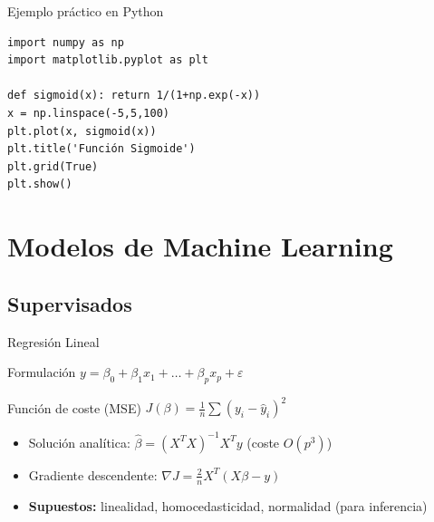 \documentclass[aspectratio=169, 10pt, xcolor=table]{beamer}
\begin{document}
\begin{frame}[fragile]{Ejemplo práctico en Python}
    \begin{lstlisting}
import numpy as np
import matplotlib.pyplot as plt

def sigmoid(x): return 1/(1+np.exp(-x))
x = np.linspace(-5,5,100)
plt.plot(x, sigmoid(x))
plt.title('Función Sigmoide')
plt.grid(True)
plt.show()
    \end{lstlisting}
\end{frame}

\section{Modelos de Machine Learning}

\subsection{Supervisados}

\begin{frame}{Regresión Lineal}
    \begin{block}{Formulación}
        $y = \beta_0 + \beta_1 x_1 + \dots + \beta_p x_p + \varepsilon$
    \end{block}
    \begin{exampleblock}{Función de coste (MSE)}
        $J(\beta) = \frac{1}{n}\sum (y_i - \hat{y}_i)^2$
    \end{exampleblock}
    \begin{itemize}
        \item Solución analítica: $\hat{\beta} = (X^TX)^{-1}X^Ty$ (coste $O(p^3)$)
        \item Gradiente descendente: $\nabla J = \frac{2}{n}X^T(X\beta - y)$
        \item \textbf{Supuestos:} linealidad, homocedasticidad, normalidad (para inferencia)
    \end{itemize}
\end{frame}
\end{document}
